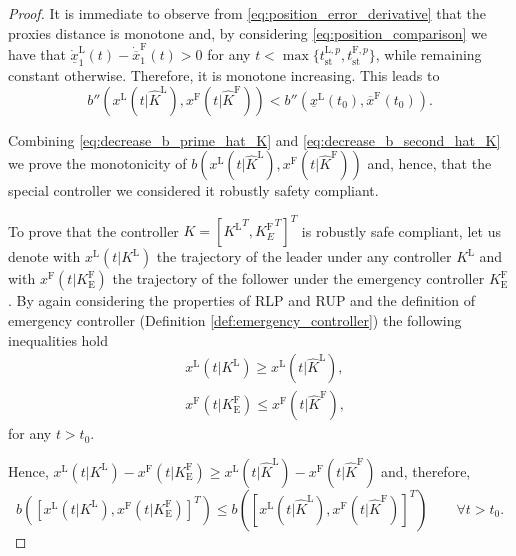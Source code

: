 \begin{theorem}
\begin{proof}
		
		
		
		It is immediate to observe from \eqref{eq:position_error_derivative} that the proxies distance is monotone and, by considering \eqref{eq:position_comparison} we have that $\dot{\underline{x}}_1^\mathrm{L}(t)-\dot{\overline{x}}_1^\mathrm{F}(t)>0$ for any $t< \max\{t_{\mathrm{st}}^{\mathrm{L},p},t_{\mathrm{st}}^{\mathrm{F},p} \}$, while remaining constant otherwise. Therefore, it is monotone increasing. This leads  to 
		\begin{equation}\label{eq:decrease_b_second_hat_K}
			b''(x^\mathrm{L}(t | \hat{K}^\mathrm{L}),x^\mathrm{F}(t | \hat{K}^\mathrm{F}))< b''(\underline{x}^\mathrm{L}(t_0),\overline{x}^\mathrm{F}(t_0)). 
		\end{equation}
		
		Combining \eqref{eq:decrease_b_prime_hat_K} and \eqref{eq:decrease_b_second_hat_K} we prove the  monotonicity of $b(x^\mathrm{L}(t | \hat{K}^\mathrm{L}),x^\mathrm{F}(t | \hat{K}^\mathrm{F}))$ and, hence, that the special controller we considered it robustly safety compliant. 
		
		To prove that the controller $K=[{K^\mathrm{L}}^T, {K^\mathrm{F}_E}^T]^T$ is robustly safe compliant, let us denote with
		$x^\mathrm{L}(t | K^\mathrm{L})$ the trajectory of the leader under any controller $K^\mathrm{L}$ and with $x^\mathrm{F}(t | K_\mathrm{E}^\mathrm{F})$ the trajectory of the follower under the emergency controller $K_\mathrm{E}^\mathrm{F}$.  
		By again considering the properties of RLP and RUP and 
		the definition of emergency controller (Definition \ref{def:emergency_controller}) the following inequalities hold
		\begin{eqnarray}
			&x^\mathrm{L}(t | K^\mathrm{L})\geq x^\mathrm{L}(t | \hat{K}^\mathrm{L}), \label{eq:inequality2_leader}\\
			& x^\mathrm{F}(t | K_\mathrm{E}^\mathrm{F})\leq x^\mathrm{F}(t | \hat{K}^\mathrm{F}),\label{eq:inequality2_follower}
		\end{eqnarray}
		for any $t>t_0$.
		
		Hence, $x^\mathrm{L}(t | K^\mathrm{L})-x^\mathrm{F}(t | K_\mathrm{E}^\mathrm{F}) \geq x^\mathrm{L}(t | \hat{K}^\mathrm{L})-x^\mathrm{F}(t | \hat{K}^\mathrm{F})$ and, therefore, 
		\begin{equation*}
			b([x^\mathrm{L}(t | K^\mathrm{L}),x^\mathrm{F}(t |K_\mathrm{E}^\mathrm{F})]^T)\leq  b([x^\mathrm{L}(t | \hat{K}^\mathrm{L}),x^\mathrm{F}(t |\hat{K}^\mathrm{F})]^T) \qquad \forall t>t_0. 
		\end{equation*}
		
		
	\end{proof}
	
		\end{theorem}
		
